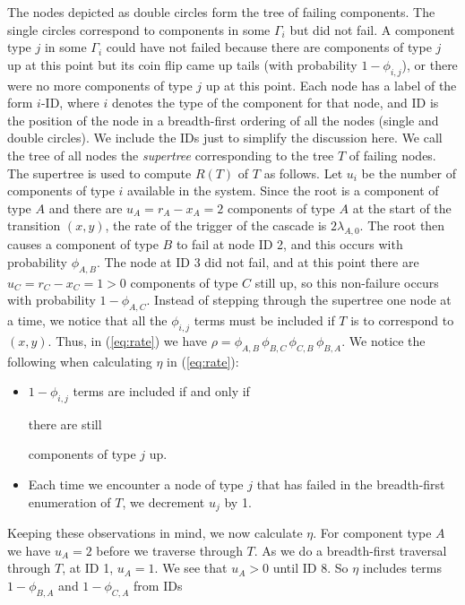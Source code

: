 \documentclass[12pt]{article}
\def\myxout{\bgroup \markoverwith{\textcolor{red}{\hbox to.35em{\hss/\hss}}}\ULon}
\newcommand{\deleted}[1]{}
\newcommand{\changed}[1]{#1}
\newcommand{\changed}[1]{\textcolor{red}{#1}}
\newcommand{\deleted}[1]{{\myxout{#1}}}
\begin{document}
The nodes depicted as double circles form the tree of failing components. The single circles correspond to components in some $\Gamma_i$ but did not fail.  A component type $j$ in some $\Gamma_i$ could have not failed because there are components of type $j$ up at this point but its coin flip came up tails  (with probability $1 - \phi_{i, j}$), or there were no more components of type $j$ up at this point. Each node has a label of the form $i$-ID, where $i$ denotes the type of the component for that node, and ID is the position of the node in a breadth-first ordering of all the nodes (single and double circles). We include the IDs just to simplify the discussion here. We call the tree of all nodes the \textit{supertree} corresponding to the tree $T$ of failing nodes. The supertree is used to compute $R(T)$ of $T$ as follows. Let $u_i$ be the number of components of type $i$ available in the system. Since the root is a component of type $A$ and there are $u_A = r_A - x_A = 2$ components of type $A$ at the start of the transition $(x, y)$, the rate of the trigger of the cascade is $2 \lambda_{A, 0}$. The root then causes a component of type $B$ to fail at node ID 2, and this occurs with probability $\phi_{A, B}$. The node at ID 3 did not fail, and at this point there are $u_C = r_C - x_C = 1 > 0$ components of type $C$ still up, so this non-failure occurs with probability $1 - \phi_{A,C}$. Instead of stepping through the supertree one node at a time, we notice that all the $\phi_{i, j}$ terms must be included if $T$ is to correspond to $(x, y)$. Thus, 
\changed{in (\ref{eq:rate})} we have
$\rho = \phi_{A, B} \, \phi_{B, C} \, \phi_{C, B} \, \phi_{B, A}$.
We notice the following when calculating $\eta$
\changed{in (\ref{eq:rate})}:
\begin{itemize}
\item
$1 - \phi_{i, j}$ terms are included 
\changed{if and only if}
\deleted{only until} 
there are 
\changed{still}
\deleted{no more} 
components of type $j$ up.
\deleted{\\
\hspace*{-1.8em} \
$\bullet$ Once the components of type $j$ are exhausted, all subsequent $1 - \phi_{i, j}$ terms (in breadth-first order) are not included.}
\item
Each time we encounter a node of type $j$ that has failed in the breadth-first enumeration of $T$, we decrement $u_j$ by 1.
\end{itemize}
Keeping these observations in mind, we
now calculate $\eta$. For component type $A$ we have $u_A = 2$ before we traverse through $T$. As we do a breadth-first traversal through $T$, at ID 1, $u_A = 1$. We see that $u_A > 0$ until ID 8. So $\eta$ includes terms $1 - \phi_{B, A}$ and $1 - \phi_{C, A}$ from IDs
\end{document}
